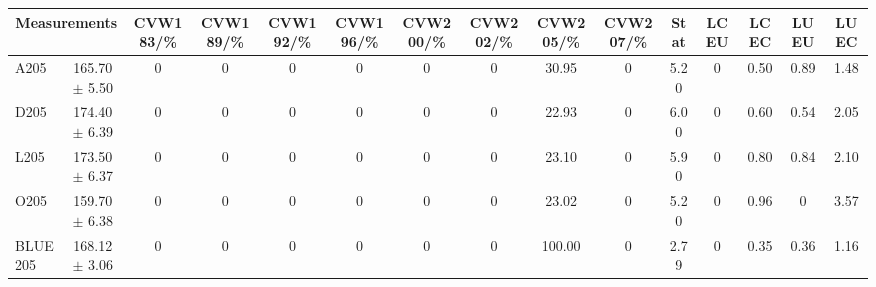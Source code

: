 \begin{table}[H]
\scriptsize
\begin{center}
\renewcommand{\arraystretch}{1.1}
\begin{tabular}{|lc|c|c|c|c|c|c|c|c|ccccc|}
\hline
\multicolumn{2}{|c|}{Measurements} & CVW{\tiny 183}/\%  & CVW{\tiny 189}/\%  & CVW{\tiny 192}/\%  & CVW{\tiny 196}/\%  & CVW{\tiny 200}/\%  & CVW{\tiny 202}/\%  & CVW{\tiny 205}/\%  & CVW{\tiny 207}/\%  & {\tiny Stat} & {\tiny LCEU} & {\tiny LCEC} & {\tiny LUEU} & {\tiny LUEC}\\
\hline
A205 &     165.70 $\pm$       5.50 &  0 &  0 &  0 &  0 &  0 &  0 &      30.95 &  0 &       5.20 &  0 &       0.50 &       0.89 &       1.48\\
D205 &     174.40 $\pm$       6.39 &  0 &  0 &  0 &  0 &  0 &  0 &      22.93 &  0 &       6.00 &  0 &       0.60 &       0.54 &       2.05\\
L205 &     173.50 $\pm$       6.37 &  0 &  0 &  0 &  0 &  0 &  0 &      23.10 &  0 &       5.90 &  0 &       0.80 &       0.84 &       2.10\\
O205 &     159.70 $\pm$       6.38 &  0 &  0 &  0 &  0 &  0 &  0 &      23.02 &  0 &       5.20 &  0 &       0.96 &  0 &       3.57\\
\hline
BLUE {\tiny 205} &     168.12 $\pm$       3.06 &  0 &  0 &  0 &  0 &  0 &  0 &     100.00 &  0 &       2.79 &  0 &       0.35 &       0.36 &       1.16\\
\hline
\end{tabular}
\renewcommand{\arraystretch}{1}
\end{center}
\end{table}
\vspace*{-0.5cm}
